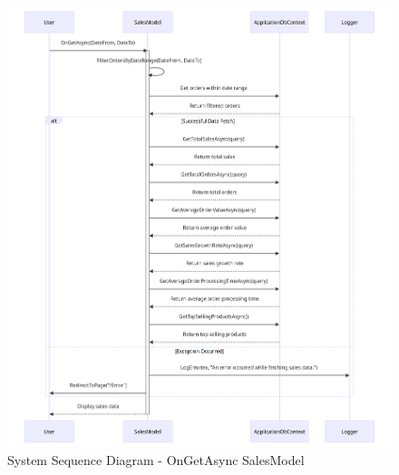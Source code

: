 \begin{figure}
    \centering
    \includegraphics[width=1\textwidth]{figures/diagrams/ssd-ongetasync-salesmodel.png}
    \caption{System Sequence Diagram - OnGetAsync SalesModel}
    \label{fig:ssd-ongetasync-salesmodel}
\end{figure}
